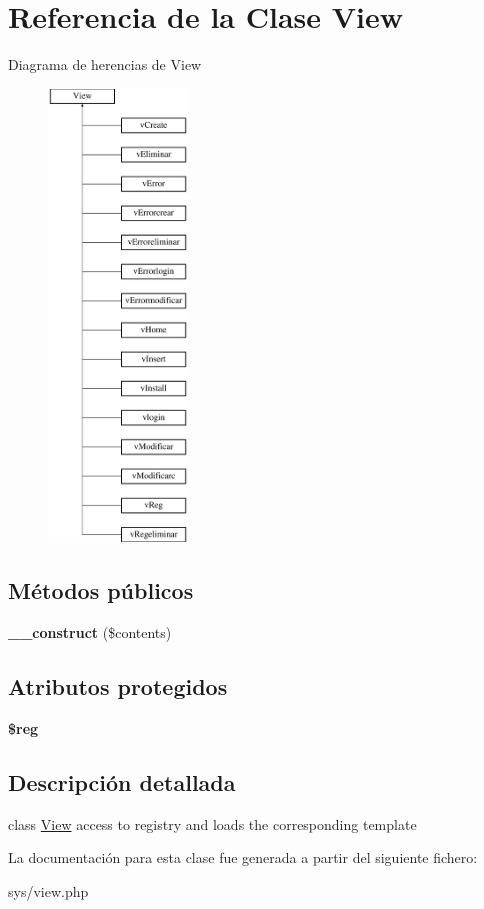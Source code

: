 \hypertarget{class_view}{}\section{Referencia de la Clase View}
\label{class_view}
Diagrama de herencias de View\begin{figure}[H]
\begin{center}
\leavevmode
\includegraphics[height=12.000000cm]{class_view}
\end{center}
\end{figure}
\subsection*{Métodos públicos}
\begin{DoxyCompactItemize}
\item 
\hypertarget{class_view_a0566cdd65c004851d2ba7fb0b0fc19f6}{}{\bfseries \+\_\+\+\_\+construct} (\$contents)\label{class_view_a0566cdd65c004851d2ba7fb0b0fc19f6}

\end{DoxyCompactItemize}
\subsection*{Atributos protegidos}
\begin{DoxyCompactItemize}
\item 
\hypertarget{class_view_ab17fbe2ab68dbf274177a2b974b4eb23}{}{\bfseries \$reg}\label{class_view_ab17fbe2ab68dbf274177a2b974b4eb23}

\end{DoxyCompactItemize}


\subsection{Descripción detallada}
class \hyperlink{class_view}{View} access to registry and loads the corresponding template 

La documentación para esta clase fue generada a partir del siguiente fichero\+:\begin{DoxyCompactItemize}
\item 
sys/view.\+php\end{DoxyCompactItemize}
